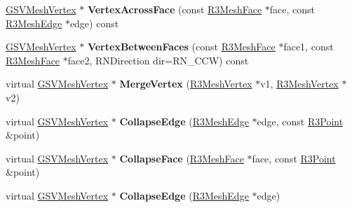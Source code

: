 \begin{DoxyCompactItemize}
\item 
\hyperlink{class_g_s_v_mesh_vertex}{G\+S\+V\+Mesh\+Vertex} $\ast$ {\bfseries Vertex\+Across\+Face} (const \hyperlink{class_r3_mesh_face}{R3\+Mesh\+Face} $\ast$face, const \hyperlink{class_r3_mesh_edge}{R3\+Mesh\+Edge} $\ast$edge) const \hypertarget{class_g_s_v_mesh_a20343b61ca9442eb4945adcd76a53941}{}\label{class_g_s_v_mesh_a20343b61ca9442eb4945adcd76a53941}

\item 
\hyperlink{class_g_s_v_mesh_vertex}{G\+S\+V\+Mesh\+Vertex} $\ast$ {\bfseries Vertex\+Between\+Faces} (const \hyperlink{class_r3_mesh_face}{R3\+Mesh\+Face} $\ast$face1, const \hyperlink{class_r3_mesh_face}{R3\+Mesh\+Face} $\ast$face2, R\+N\+Direction dir=R\+N\+\_\+\+C\+CW) const \hypertarget{class_g_s_v_mesh_aa3d1c1a04c86e330d6075b5374e9c529}{}\label{class_g_s_v_mesh_aa3d1c1a04c86e330d6075b5374e9c529}

\item 
virtual \hyperlink{class_g_s_v_mesh_vertex}{G\+S\+V\+Mesh\+Vertex} $\ast$ {\bfseries Merge\+Vertex} (\hyperlink{class_r3_mesh_vertex}{R3\+Mesh\+Vertex} $\ast$v1, \hyperlink{class_r3_mesh_vertex}{R3\+Mesh\+Vertex} $\ast$v2)\hypertarget{class_g_s_v_mesh_a4b271c421a7dd1741f7ce5e3c1bf60a6}{}\label{class_g_s_v_mesh_a4b271c421a7dd1741f7ce5e3c1bf60a6}

\item 
virtual \hyperlink{class_g_s_v_mesh_vertex}{G\+S\+V\+Mesh\+Vertex} $\ast$ {\bfseries Collapse\+Edge} (\hyperlink{class_r3_mesh_edge}{R3\+Mesh\+Edge} $\ast$edge, const \hyperlink{class_r3_point}{R3\+Point} \&point)\hypertarget{class_g_s_v_mesh_aa2f4cf7614c8bc3bdd0382dc34f9f19f}{}\label{class_g_s_v_mesh_aa2f4cf7614c8bc3bdd0382dc34f9f19f}

\item 
virtual \hyperlink{class_g_s_v_mesh_vertex}{G\+S\+V\+Mesh\+Vertex} $\ast$ {\bfseries Collapse\+Face} (\hyperlink{class_r3_mesh_face}{R3\+Mesh\+Face} $\ast$face, const \hyperlink{class_r3_point}{R3\+Point} \&point)\hypertarget{class_g_s_v_mesh_ae6d11bb1fe286c0f6ca45d9b6e7fe2e8}{}\label{class_g_s_v_mesh_ae6d11bb1fe286c0f6ca45d9b6e7fe2e8}

\item 
virtual \hyperlink{class_g_s_v_mesh_vertex}{G\+S\+V\+Mesh\+Vertex} $\ast$ {\bfseries Collapse\+Edge} (\hyperlink{class_r3_mesh_edge}{R3\+Mesh\+Edge} $\ast$edge)\hypertarget{class_g_s_v_mesh_a2bce05c396e58b42129dd82bb74cde44}{}\label{class_g_s_v_mesh_a2bce05c396e58b42129dd82bb74cde44}


\end{DoxyCompactItemize}
